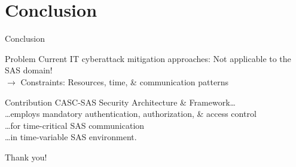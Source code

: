\documentclass[en]{sdqbeamer}
\begin{document}
\section{Conclusion}
\begin{frame}{Conclusion}
    \begin{redblock}{Problem}
        Current IT cyberattack mitigation approaches: Not applicable to the SAS domain!
        \\$\rightarrow$ Constraints: Resources, time, \& communication patterns
    \end{redblock}
    \begin{blueblock}{Contribution}
        CASC-SAS Security Architecture \& Framework\dots
        \\\dots employs mandatory authentication, authorization, \& access control
        \\\dots for time-critical SAS communication
        \\\dots in time-variable SAS environment.
    \end{blueblock}
    \vspace{0.5em}
    \centering
    \huge
    Thank you!
\end{frame}

\appendix
\beginbackup
\end{document}
